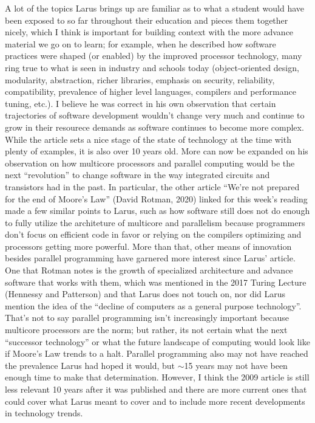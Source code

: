 \documentclass [12pt]{article}
\begin{document}
        A lot of the topics Larus brings up are familiar as to what a student would have been exposed to so far throughout their education and pieces them together nicely, which I think is important for building context with the more advance material we go on to learn; for example, when he described how software practices were shaped (or enabled) by the improved processor technology, many ring true to what is seen in industry and schools today (object-oriented design, modularity, abstraction, richer libraries, emphasis on security, reliability, compatibility, prevalence of higher level languages, compilers and performance tuning, etc.). I believe he was correct in his own observation that certain trajectories of software development wouldn't change very much and continue to grow in their resourece demands as software continues to become more complex. While the article sets a nice stage of the state of technology at the time with plenty of examples, it is also over 10 years old. More can now be expanded on his observation on how multicore processors and parallel computing would be the next ``revolution'' to change software in the way integrated circuits and transistors had in the past. In particular, the other article ``We're not prepared for the end of Moore's Law'' (David Rotman, 2020) linked for this week's reading made a few similar points to Larus, such as how software still does not do enough to fully utilize the architeture of multicore and parallelism because programmers don't focus on efficient code in favor or relying on the compilers optimizing and processors getting more powerful. More than that, other means of innovation besides parallel programming have garnered more interest since Larus' article. One that Rotman notes is the growth of specialized architecture and advance software that works with them, which was mentioned in the 2017 Turing Lecture (Hennessy and Patterson) and that Larus does not touch on, nor did Larus mention the idea of the ``decline of computers as a general purpose technology''. That's not to say parallel programming isn't increasingly important because multicore processors are the norm; but rather, its not certain what the next ``successor technology'' or what the future landscape of computing would look like if Moore's Law trends to a halt. Parallel programming also may not have reached the prevalence Larus had hoped it would, but $\sim$15 years may not have been enough time to make that determination. However, I think the 2009 article is still less relevant 10 years after it was published and there are more current ones that could cover what Larus meant to cover and to include more recent developments in technology trends. 
\end{document}
